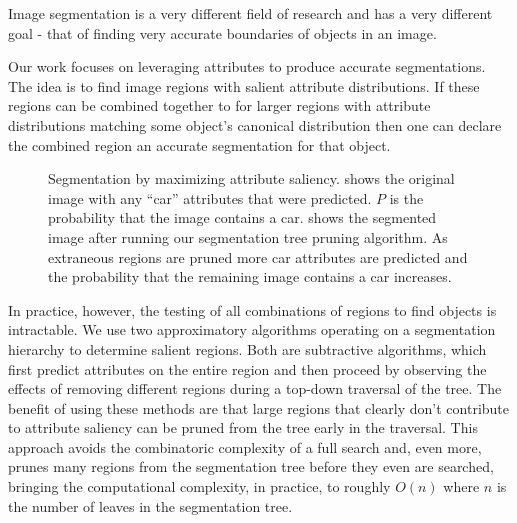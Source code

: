 \documentclass[10pt,twocolumn,letterpaper]{article}
\begin{document}
Image segmentation is a very different field of research and has a very different
goal - that of finding very accurate boundaries of objects in an image.

Our work focuses on leveraging attributes to produce accurate segmentations.
The idea is to find image regions with salient attribute distributions.  If
these regions can be combined together to for larger regions with attribute 
distributions matching some object's canonical distribution then one can
declare the combined region an accurate segmentation for that object.

\begin{figure}
\label{fig:truck}
\centering
{}
\caption{Segmentation by maximizing attribute saliency.   shows
the original image with any ``car'' attributes that were predicted.  $P$ is the probability
that the image contains a car.   shows the segmented image after
running our segmentation tree pruning algorithm.  As extraneous regions are pruned
more car attributes are predicted and the probability that the remaining image 
contains a car increases.}
\end{figure}

In practice, however, the testing of all combinations of regions to find 
objects is intractable.  We use two approximatory algorithms operating on
a segmentation hierarchy to determine salient regions.  Both are subtractive
algorithms, which first predict attributes on the entire region and then
proceed by observing the effects of removing different regions during
a top-down traversal of the tree.  The benefit of using these methods are
that large regions that clearly don't contribute to attribute saliency
can be pruned from the tree early in the traversal.  This approach avoids
the combinatoric complexity of a full search and, even more, prunes many
regions from the segmentation tree before they even are searched, bringing
the computational complexity, in practice, to roughly $O(n)$ where $n$ is
the number of leaves in the segmentation tree.
\end{document}
